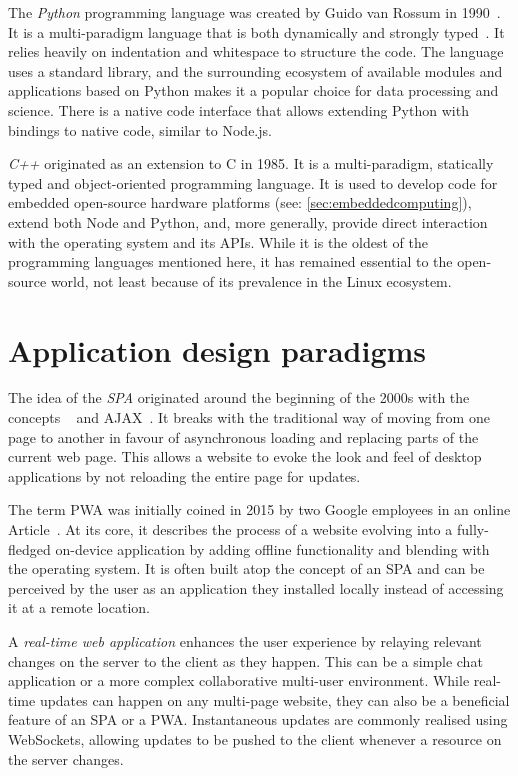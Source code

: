 The \emph{Python} programming language was created by Guido van Rossum in 1990~\parencite{pythonHistory}.
It is a multi-paradigm language that is both dynamically and strongly typed~\parencite{pythonTyping}.
It relies heavily on indentation and whitespace to structure the code.
The language uses a standard library, and the surrounding ecosystem of available modules and applications based on Python makes it a popular choice for data processing and science.
There is a native code interface that allows extending Python with bindings to native code, similar to Node.js.

\emph{C++} originated as an extension to C in 1985.
It is a multi-paradigm, statically typed and object-oriented programming language.
It is used to develop code for embedded open-source hardware platforms (see: \autoref{sec:embeddedcomputing}), extend both Node and Python, and, more generally, provide direct interaction with the operating system and its APIs.
While it is the oldest of the programming languages mentioned here, it has remained essential to the open-source world, not least because of its prevalence in the Linux ecosystem.

\section{Application design paradigms}
\label{sec:application-design-paradigms}

The idea of the \emph{\ac{SPA}} originated around the beginning of the 2000s with the concepts ~\parencite{innerBrowsing} and \ac{AJAX}~\parencite{ajaxNewApproach}.
It breaks with the traditional way of moving from one page to another in favour of asynchronous loading and replacing parts of the current web page.
This allows a website to evoke the look and feel of desktop applications by not reloading the entire page for updates.

The term \ac{PWA} was initially coined in 2015 by two Google employees in an online Article~\parencite{progressiveWebApplications}.
At its core, it describes the process of a website  evolving into a fully-fledged on-device application by adding offline functionality and blending with the operating system.
It is often built atop the concept of an \ac{SPA} and can be perceived by the user as an application they installed locally instead of accessing it at a remote location.

A \emph{real-time web application} enhances the user experience by relaying relevant changes on the server to the client as they happen.
This can be a simple chat application or a more complex collaborative multi-user environment.
While real-time updates can happen on any multi-page website, they can also be a beneficial feature of an \ac{SPA} or a \ac{PWA}.
Instantaneous updates are commonly realised using WebSockets, allowing updates to be pushed to the client whenever a resource on the server changes.

